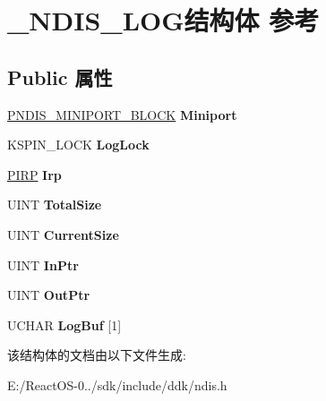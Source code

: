 \hypertarget{struct___n_d_i_s___l_o_g}{}\section{\+\_\+\+N\+D\+I\+S\+\_\+\+L\+O\+G结构体 参考}
\label{struct___n_d_i_s___l_o_g}
\subsection*{Public 属性}
\begin{DoxyCompactItemize}
\item 
\mbox{\label{struct___n_d_i_s___l_o_g_a6e367b8383d800e77238570b81cc228b}} 
\hyperlink{struct___n_d_i_s___m_i_n_i_p_o_r_t___b_l_o_c_k}{P\+N\+D\+I\+S\+\_\+\+M\+I\+N\+I\+P\+O\+R\+T\+\_\+\+B\+L\+O\+CK} {\bfseries Miniport}
\item 
\mbox{\label{struct___n_d_i_s___l_o_g_a5d7a1ae41b0be218ef49f5bcb04c0df3}} 
K\+S\+P\+I\+N\+\_\+\+L\+O\+CK {\bfseries Log\+Lock}
\item 
\mbox{\label{struct___n_d_i_s___l_o_g_a5feb30ba6867a2425375021c3b433be9}} 
\hyperlink{interfacevoid}{P\+I\+RP} {\bfseries Irp}
\item 
\mbox{\label{struct___n_d_i_s___l_o_g_ac20ccd712d1739e26db28c6104a6eddd}} 
U\+I\+NT {\bfseries Total\+Size}
\item 
\mbox{\label{struct___n_d_i_s___l_o_g_a8e632db89e324a1f2a10e5db1d3b2948}} 
U\+I\+NT {\bfseries Current\+Size}
\item 
\mbox{\label{struct___n_d_i_s___l_o_g_a8bfc02948c23d888e3e22316452126e6}} 
U\+I\+NT {\bfseries In\+Ptr}
\item 
\mbox{\label{struct___n_d_i_s___l_o_g_a4362240f20c424da090508b3493808f8}} 
U\+I\+NT {\bfseries Out\+Ptr}
\item 
\mbox{\label{struct___n_d_i_s___l_o_g_a07ea5f7926e8cc230c4a16dba461f5b8}} 
U\+C\+H\+AR {\bfseries Log\+Buf} \mbox{[}1\mbox{]}
\end{DoxyCompactItemize}


该结构体的文档由以下文件生成\+:\begin{DoxyCompactItemize}
\item 
E\+:/\+React\+O\+S-\/0../sdk/include/ddk/ndis.\+h\end{DoxyCompactItemize}
